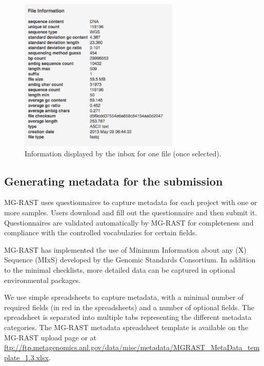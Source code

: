 \documentclass[12pt,fullpage]{report}
\begin{document}
\begin{figure}
\begin{center}
\includegraphics[width=3in]{Images/Inbox-File-Information.png}
\end{center}
\caption{
Information displayed by the inbox for one file (once selected).
}
\label{fig:Inbox-File-Information}
\end{figure}



\subsection{Generating metadata for the submission}

MG-RAST uses questionnaires to capture metadata for each project with one or more samples. Users download and fill out the questionnaire and then submit it.
Questionnaires are validated
automatically by MG-RAST
for completeness and compliance with the controlled vocabularies for certain fields.

MG-RAST has implemented the use of Minimum Information about any (X) Sequence (MIxS)\cite{MIENS} developed by the Genomic Standards Consortium. In addition to the minimal checklists, more detailed data can be captured in optional environmental packages.

We use simple spreadsheets to capture metadata, with a minimal number of required fields (in red in the spreadsheets) and a number of optional fields. The spreadsheet is separated into multiple tabs representing the different metadata categories. The MG-RAST metadata spreadsheet template is available on the MG-RAST upload page or at \url{ftp://ftp.metagenomics.anl.gov/data/misc/metadata/MGRAST_MetaData_template_1.3.xlsx}.
\end{document}

